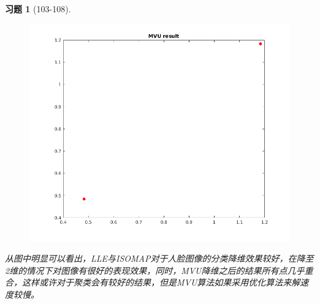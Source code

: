 \documentclass[a4paper, UTF8]{ctexart}
\newtheorem*{exercise}{\textbf{习题}}
\begin{document}
\begin{exercise}[103-108]
\begin{figure}[htbp!]
      \includegraphics[width = \textwidth]{hw7_fig7.png}
    \end{figure}
    \clearpage
  	从图中明显可以看出，LLE与ISOMAP对于人脸图像的分类降维效果较好，在降至2维的情况下对图像有很好的表现效果，同时，MVU降维之后的结果所有点几乎重合，这样或许对于聚类会有较好的结果，但是MVU算法如果采用优化算法来解速度较慢。
  \end{exercise}
\end{document}
